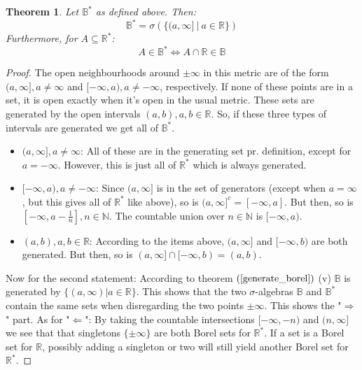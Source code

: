 \documentclass[12pt, a4paper]{article}
\newtheorem{theorem}{Theorem}[section]
\numberwithin{equation}{section}
\begin{document}
\begin{theorem}
\label{generate_borel_star}
Let $\mathbb{B}^*$ as defined above. Then:
\begin{equation}
\mathbb{B}^*=\sigma\left(\{(a,\infty]\ |\ a\in\mathbb{R}\}\right)
\end{equation}
Furthermore, for $A\subseteq\mathbb{R}^*$:
\begin{equation}
A\in\mathbb{B}^*\Leftrightarrow A\cap\mathbb{R}\in\mathbb{B}
\end{equation}
\end{theorem}
\begin{proof}
The open neighbourhoods around $\pm\infty$ in this metric are of the form $(a,\infty], a\neq\infty$ and $[-\infty,a), a\neq-\infty$, respectively. If none of these points are in a set, it is open exactly when it's open in the usual metric. These sets are generated by the open intervals $(a,b), a,b\in\mathbb{R}$. So, if these three types of intervals are generated we get all of $\mathbb{B}^*$.
\begin{itemize}
\item $(a,\infty], a\neq\infty$: All of these are in the generating set pr. definition, except for $a=-\infty$. However, this is just all of $\mathbb{R}^*$ which is always generated.
\item $[-\infty,a), a\neq-\infty$: Since $(a,\infty]$ is in the set of generators (except when $a=\infty$, but this gives all of $\mathbb{R}^*$ like above), so is $(a,\infty]^c=[-\infty,a]$. But then, so is $\left[-\infty,a-\frac{1}{n}\right], n\in\mathbb{N}$. The countable union over $n\in\mathbb{N}$ is $[-\infty,a)$.
\item $(a,b), a,b\in\mathbb{R}$: According to the items above, $(a,\infty]$ and $[-\infty,b)$ are both generated. But then, so is $(a,\infty]\cap[-\infty,b)=(a,b)$.
\end{itemize}
Now for the second statement: According to theorem $(\ref{generate_borel})$ (v) $\mathbb{B}$ is generated by $\{(a,\infty)|a\in\mathbb{R}\}$. This shows that the two $\sigma$-algebras $\mathbb{B}$ and $\mathbb{B}^*$ contain the same sets when disregarding the two points $\pm\infty$. This shows the "$\Rightarrow$" part. As for "$\Leftarrow$": By taking the countable intersections $[-\infty,-n)$ and $(n,\infty]$ we see that that singletons $\{\pm\infty\}$ are both Borel sets for $\mathbb{R}^*$. If a set is a Borel set for $\mathbb{R}$, possibly adding a singleton or two will still yield another Borel set for $\mathbb{R}^*$.
\end{proof}
\end{document}
